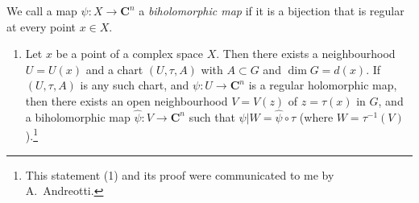 \documentclass{article}
\theoremstyle{plain}
\theoremstyle{definition}
\newcommand{\CC}{\mathbf{C}}
\begin{document}
We call a map $\psi\colon X\to\CC^n$ a \emph{biholomorphic map} if it is a bijection that is regular at every point $x\in X$.

\begin{enumerate}[(1)]
  \itshape
  \item Let $x$ be a point of a complex space $X$.
    Then there exists a neighbourhood $U=U(x)$ and a chart $(U,\tau,A)$ with $A\subset G$ and $\dim G=d(x)$.
    If $(U,\tau,A)$ is any such chart, and $\psi\colon U\to\CC^n$ is a regular holomorphic map, then there exists an open neighbourhood $V=V(z)$ of $z=\tau(x)$ in $G$, and a biholomorphic map $\hat{\psi}\colon V\to\CC^n$ such that $\psi|W=\hat{\psi}\circ\tau$ (where $W=\tau^{-1}(V)$).\footnote{This statement (1) and its proof were communicated to me by A.~Andreotti.}
\end{enumerate}



\nocite{*}
\end{document}
